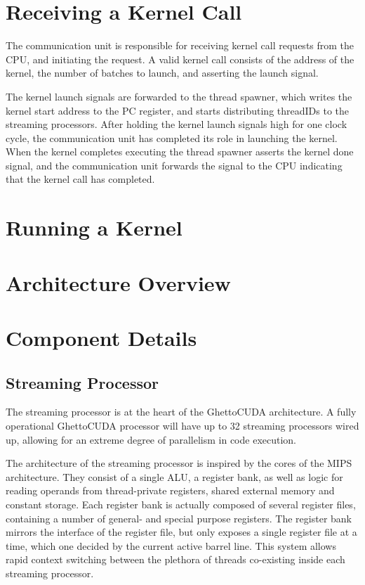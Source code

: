 \section{Receiving a Kernel Call}
The communication unit is responsible for receiving kernel call requests from the CPU, and initiating the request.
A valid kernel call consists of the address of the kernel, the number of batches to launch, and asserting the launch signal.

The kernel launch signals are forwarded to the thread spawner, which writes the kernel start address to the PC register, and starts distributing threadIDs to the streaming processors. 
After holding the kernel launch signals high for one clock cycle, the communication unit has completed its role in launching the kernel.
When the kernel completes executing the thread spawner asserts the kernel done signal, and the communication unit forwards the signal to the CPU indicating that the kernel call has completed.


\section{Running a Kernel}

\section{Architecture Overview}

\section{Component Details}

\subsection{Streaming Processor}

The streaming processor is at the heart of the GhettoCUDA architecture.
A fully operational GhettoCUDA processor will have up to 32 streaming processors wired up, allowing for an extreme degree of parallelism in code execution.

The architecture of the streaming processor is inspired by the cores of the MIPS architecture.
They consist of a single ALU, a register bank, as well as logic for reading operands from thread-private registers, shared external memory and constant storage.
Each register bank is actually composed of several register files, containing a number of general- and special purpose registers.
The register bank mirrors the interface of the register file, but only exposes a single register file at a time, which one decided by the current active barrel line.
This system allows rapid context switching between the plethora of threads co-existing inside each streaming processor.

